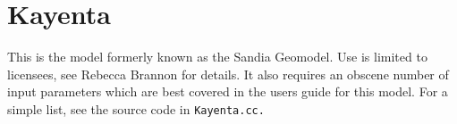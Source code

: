 \section{\bf Kayenta} This is the model formerly known as the Sandia Geomodel.  Use
is limited to licensees, see Rebecca Brannon for details.  It also requires
an obscene number of input parameters which are best covered in the users
guide for this model.  For a simple list, see the source code in
\tt Kayenta.cc. \normalfont
